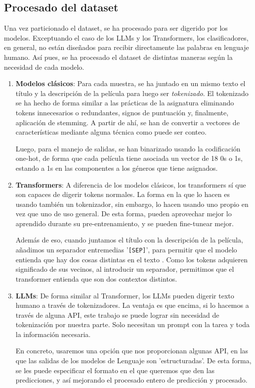 \documentclass[11pt,spanish,listoffigures,listoftables]{tfgetsinf}
\begin{document}
\subsection{Procesado del dataset}
Una vez particionado el dataset, se ha procesado para ser digerido por los modelos. Exceptuando el caso de los LLMs y los Transformers, los clasificadores, en general, no están diseñados para recibir directamente las palabras en lenguaje humano. Así pues, se ha procesado el dataset de distintas maneras según la necesidad de cada modelo.

\begin{enumerate}
    \item \textbf{Modelos clásicos}: Para cada muestra, se ha juntado en un mismo texto el título y la descripción de la película para luego ser \textit{tokenizado}. El tokenizado se ha hecho de forma similar a las prácticas de la asignatura eliminando tokens innecesarios o redundantes, signos de puntuación y, finalmente, aplicación de stemming. A partir de ahí, se han de convertir a vectores de características mediante alguna técnica como puede ser conteo.
    
    Luego, para el manejo de salidas, se han binarizado usando la codificación one-hot, de forma que cada película tiene asociada un vector de 18 0s o 1s, estando a 1s en las componentes a los géneros que tiene asignados. 
    
    \item \textbf{Transformers}: A diferencia de los modelos clásicos, los transformers sí que son capaces de digerir tokens normales. La forma en la que lo hacen es usando también un tokenizador, sin embargo, lo hacen usando uno propio en vez que uno de uso general. De esta forma, pueden aprovechar mejor lo aprendido durante su pre-entrenamiento, y se pueden fine-tunear mejor.

    Además de eso, cuando juntamos el título con la descripción de la película, añadimos un separador entremedias '\texttt{[SEP]}', para permitir que el modelo entienda que hay dos cosas distintas en el texto \cite{mohebbi-2021}. Como los tokens adquieren significado de sus vecinos, al introducir un separador, permitimos que el transformer entienda que son dos contextos distintos.

    \item \textbf{LLMs}: De forma similar al Transformer, los LLMs pueden digerir texto humano a través de tokenizadores. La ventaja es que encima, si lo hacemos a través de alguna API, este trabajo se puede lograr sin necesidad de tokenización por nuestra parte. Solo necesitan un prompt con la tarea y toda la información necesaria. 

    En concreto, usaremos una opción que nos proporcionan algunas API, en las que las salidas de los modelos de Lenguaje son 'estructuradas'. De esta forma, se les puede especificar el formato en el que queremos que den las predicciones, y así mejorando el procesado entero de predicción y procesado. 
    
\end{enumerate}
\end{document}
